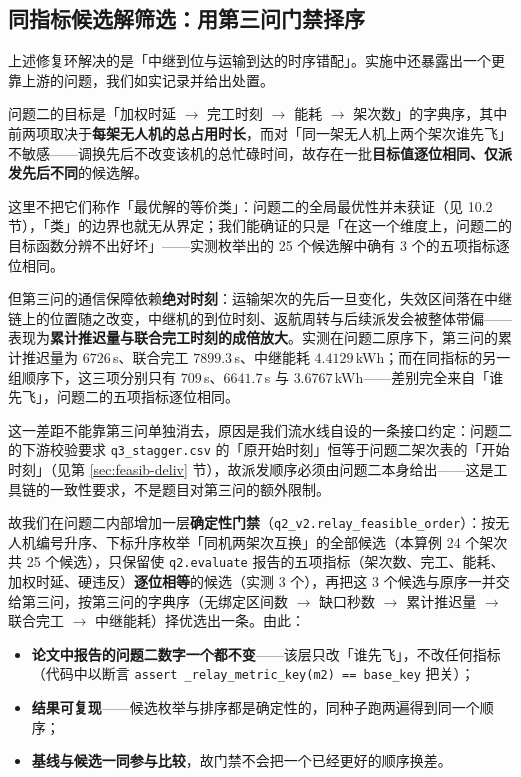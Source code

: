 \subsection{同指标候选解筛选：用第三问门禁择序}
\label{sec:q2-gate}

上述修复环解决的是「中继到位与运输到达的时序错配」。实施中还暴露出一个更靠上游的问题，我们如实记录并给出处置。

问题二的目标是「加权时延 $\to$ 完工时刻 $\to$ 能耗 $\to$ 架次数」的字典序，其中前两项取决于\textbf{每架无人机的总占用时长}，而对「同一架无人机上两个架次谁先飞」不敏感——调换先后不改变该机的总忙碌时间，故存在一批\textbf{目标值逐位相同、仅派发先后不同}的候选解。

这里不把它们称作「最优解的等价类」：问题二的全局最优性并未获证（见 10.2 节），「类」的边界也就无从界定；我们能确证的只是「在这一个维度上，问题二的目标函数分辨不出好坏」——实测枚举出的 25 个候选解中确有 3 个的五项指标逐位相同。

但第三问的通信保障依赖\textbf{绝对时刻}：运输架次的先后一旦变化，失效区间落在中继链上的位置随之改变，中继机的到位时刻、返航周转与后续派发会被整体带偏——表现为\textbf{累计推迟量与联合完工时刻的成倍放大}。实测在问题二原序下，第三问的累计推迟量为 $6726$\,s、联合完工 $7899.3$\,s、中继能耗 $4.4129$\,kWh；而在同指标的另一组顺序下，这三项分别只有 $709$\,s、$6641.7$\,s 与 $3.6767$\,kWh——差别完全来自「谁先飞」，问题二的五项指标逐位相同。

这一差距不能靠第三问单独消去，原因是我们流水线自设的一条接口约定：问题二的下游校验要求 \texttt{q3\_stagger.csv} 的「原开始时刻」恒等于问题二架次表的「开始时刻」（见第 \ref{sec:feasib-deliv} 节），故派发顺序必须由问题二本身给出——这是工具链的一致性要求，不是题目对第三问的额外限制。

故我们在问题二内部增加一层\textbf{确定性门禁}（\texttt{q2\_v2.relay\_feasible\_order}）：按无人机编号升序、下标升序枚举「同机两架次互换」的全部候选（本算例 24 个架次共 25 个候选），只保留使 \texttt{q2.evaluate} 报告的五项指标（架次数、完工、能耗、加权时延、硬违反）\textbf{逐位相等}的候选（实测 3 个），再把这 3 个候选与原序一并交给第三问，按第三问的字典序（无绑定区间数 $\to$ 缺口秒数 $\to$ 累计推迟量 $\to$ 联合完工 $\to$ 中继能耗）择优选出一条。由此：

\begin{itemize}
	\item \textbf{论文中报告的问题二数字一个都不变}——该层只改「谁先飞」，不改任何指标（代码中以断言 \texttt{assert \_relay\_metric\_key(m2) == base\_key} 把关）；
	\item \textbf{结果可复现}——候选枚举与排序都是确定性的，同种子跑两遍得到同一个顺序；
	\item \textbf{基线与候选一同参与比较}，故门禁不会把一个已经更好的顺序换差。
\end{itemize}

